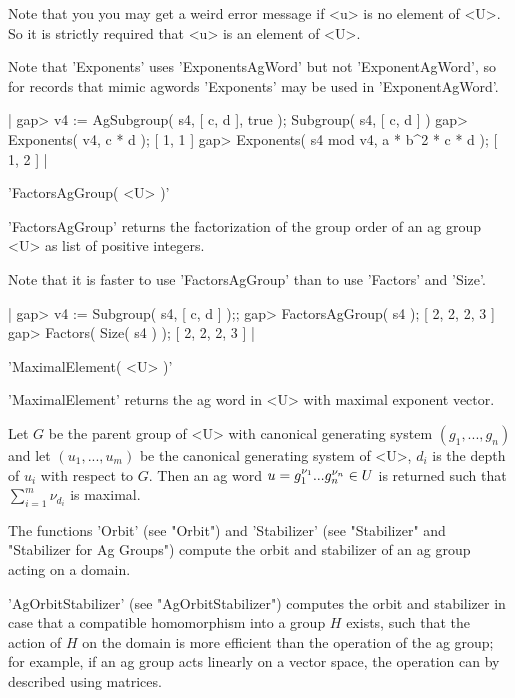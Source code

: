 Note that you you may get a weird error message if  <u>  is no element of
<U>. So it is strictly required that <u> is an element of <U>.

Note that 'Exponents' uses 'ExponentsAgWord' but not 'ExponentAgWord', so
for   records   that  mimic     agwords   'Exponents' may  be   used   in
'ExponentAgWord'.

|    gap> v4 := AgSubgroup( s4, [ c, d ], true );
    Subgroup( s4, [ c, d ] )
    gap> Exponents( v4, c * d );
    [ 1, 1 ]
    gap> Exponents( s4 mod v4, a * b^2 * c * d );
    [ 1, 2 ] |


'FactorsAgGroup( <U> )'

'FactorsAgGroup' returns the factorization  of the group  order of  an ag
group <U> as list of positive integers.

Note that it is faster to use  'FactorsAgGroup' than to use 'Factors' and
'Size'.

|    gap> v4 := Subgroup( s4, [ c, d ] );;
    gap> FactorsAgGroup( s4 );
    [ 2, 2, 2, 3 ]
    gap> Factors( Size( s4 ) );
    [ 2, 2, 2, 3 ] |


'MaximalElement( <U> )'

'MaximalElement' returns the ag word in <U> with maximal exponent vector.

Let $G$  be the  parent   group of <U> with canonical   generating system
$(g_1, ..., g_n)$ and let  $(u_1,  ..., u_m)$ be the canonical generating
system of <U>, $d_i$ is the depth of $u_i$ with respect  to $G$.  Then an
ag word $u =g_1^{\nu_1}\*  ...\*  g_n^{\nu_n}\in U$ is returned such that
$\sum_{i=1}^m \nu_{d_i}$ is maximal.



The functions 'Orbit'  (see  "Orbit") and 'Stabilizer'  (see "Stabilizer"
and "Stabilizer for Ag Groups") compute the orbit and stabilizer of an ag
group acting on a domain.

'AgOrbitStabilizer'  (see  "AgOrbitStabilizer")  computes the  orbit  and
stabilizer in   case that  a  compatible homomorphism   into a  group $H$
exists, such that the action of $H$ on the domain  is more efficient than
the operation of the ag group; for example, if an  ag group acts linearly
on a vector space, the operation can by described using matrices.

